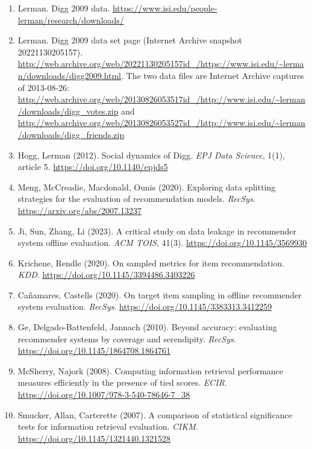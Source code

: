 {\begin{enumerate}[leftmargin=*, label=\arabic*., ref=\arabic*, itemsep=0.8em]
  \item\label{ref:lerman-digg} Lerman. Digg 2009 data. \url{https://www.isi.edu/people-lerman/research/downloads/} %
  \item\label{ref:lerman-digg-archive} Lerman. Digg 2009 data set page (Internet Archive snapshot 20221130205157). \url{http://web.archive.org/web/20221130205157id_/https://www.isi.edu/~lerman/downloads/digg2009.html}. The two data files are Internet Archive captures of 2013-08-26: \url{http://web.archive.org/web/20130826053517id_/http://www.isi.edu/~lerman/downloads/digg_votes.zip} and \url{http://web.archive.org/web/20130826053527id_/http://www.isi.edu/~lerman/downloads/digg_friends.zip} %
  \item\label{ref:hogg2012} Hogg, Lerman (2012). Social dynamics of Digg. \textit{EPJ Data Science}, 1(1), article 5. \url{https://doi.org/10.1140/epjds5} %
  \item\label{ref:meng2020} Meng, McCreadie, Macdonald, Ounis (2020). Exploring data splitting strategies for the evaluation of recommendation models. \textit{RecSys}. \url{https://arxiv.org/abs/2007.13237} %
  \item\label{ref:ji2023} Ji, Sun, Zhang, Li (2023). A critical study on data leakage in recommender system offline evaluation. \textit{ACM TOIS}, 41(3). \url{https://doi.org/10.1145/3569930} %
  \item\label{ref:krichene2020} Krichene, Rendle (2020). On sampled metrics for item recommendation. \textit{KDD}. \url{https://doi.org/10.1145/3394486.3403226} %
  \item\label{ref:canamares2020} Ca{\~n}amares, Castells (2020). On target item sampling in offline recommender system evaluation. \textit{RecSys}. \url{https://doi.org/10.1145/3383313.3412259} %
  \item\label{ref:ge2010} Ge, Delgado-Battenfeld, Jannach (2010). Beyond accuracy: evaluating recommender systems by coverage and serendipity. \textit{RecSys}. \url{https://doi.org/10.1145/1864708.1864761} %
  \item\label{ref:mcsherry2008} McSherry, Najork (2008). Computing information retrieval performance measures efficiently in the presence of tied scores. \textit{ECIR}. \url{https://doi.org/10.1007/978-3-540-78646-7_38} %
  \item\label{ref:smucker2007} Smucker, Allan, Carterette (2007). A comparison of statistical significance tests for information retrieval evaluation. \textit{CIKM}. \url{https://doi.org/10.1145/1321440.1321528} %

\end{enumerate}}
